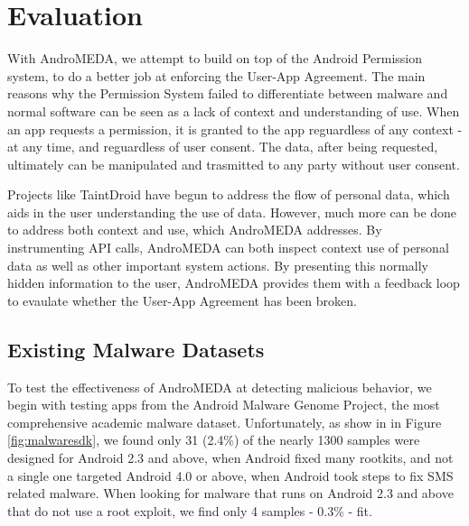 \chapter{Evaluation}
\label{sec:framework}

With AndroMEDA, we attempt to build on top of the Android Permission system, to do a better job at enforcing the User-App Agreement. The main reasons why the Permission System failed to differentiate between malware and normal software can be seen as a lack of context and understanding of use. When an app requests a permission, it is granted to the app reguardless of any context - at any time, and reguardless of user consent. The data, after being requested, ultimately can be manipulated and trasmitted to any party without user consent. 

Projects like TaintDroid\citep{enck2010taintdroid} have begun to address the flow of personal data, which aids in the user understanding the use of data. However, much more can be done to address both context and use, which AndroMEDA addresses. By instrumenting API calls, AndroMEDA can both inspect context use of personal data as well as other important system actions. By presenting this normally hidden information to the user, AndroMEDA provides them with a feedback loop to evaulate whether the User-App Agreement has been broken.

\section{Existing Malware Datasets}



To test the effectiveness of AndroMEDA at detecting malicious behavior, we begin with testing apps from the Android Malware Genome Project\citep{zhou2012dissecting}, the most comprehensive academic malware dataset. Unfortunately, as show in in Figure \ref{fig:malwaresdk}, we found only 31 (2.4\%) of the nearly 1300 samples were designed for Android 2.3 and above, when Android fixed many rootkits, and not a single one targeted Android 4.0 or above, when Android took steps to fix SMS related malware. When looking for malware that runs on Android 2.3 and above that do not use a root exploit, we find only 4 samples - 0.3\% - fit. 

